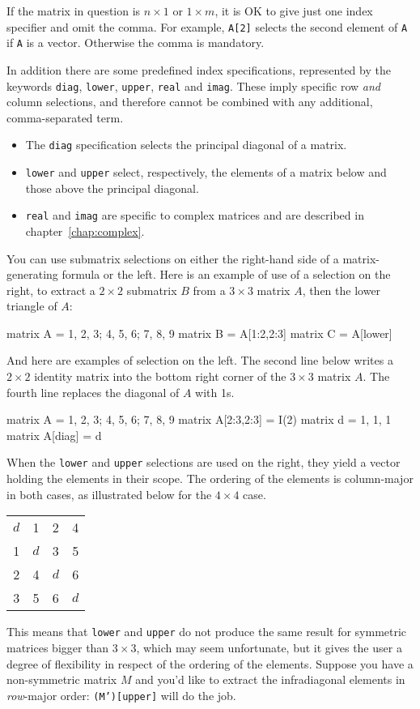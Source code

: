 If the matrix in question is $n\times 1$ or $1\times m$, it is
OK to give just one index specifier and omit the comma. For example,
\texttt{A[2]} selects the second element of \texttt{A} if \texttt{A}
is a vector. Otherwise the comma is mandatory.

In addition there are some predefined index specifications,
represented by the keywords \texttt{diag}, \texttt{lower},
\texttt{upper}, \texttt{real} and \texttt{imag}. These imply specific
row \textit{and} column selections, and therefore cannot be combined
with any additional, comma-separated term.

\begin{itemize}
\item The \texttt{diag} specification selects the principal diagonal
  of a matrix.
\item \texttt{lower} and \texttt{upper} select, respectively, the
  elements of a matrix below and those above the principal diagonal.
\item \texttt{real} and \texttt{imag} are specific to complex matrices
  and are described in chapter~\ref{chap:complex}.
\end{itemize}

You can use submatrix selections on either the right-hand side of a
matrix-generating formula or the left.  Here is an example of use of a
selection on the right, to extract a $2\times 2$ submatrix $B$ from a
$3\times 3$ matrix $A$, then the lower triangle of $A$:
%
\begin{code}
matrix A = {1, 2, 3; 4, 5, 6; 7, 8, 9}
matrix B = A[1:2,2:3]
matrix C = A[lower]
\end{code}
%
And here are examples of selection on the left.  The second line below
writes a $2\times 2$ identity matrix into the bottom right corner of the
$3\times 3$ matrix $A$.  The fourth line replaces the diagonal of $A$ 
with 1s.
%
\begin{code}
matrix A = {1, 2, 3; 4, 5, 6; 7, 8, 9}
matrix A[2:3,2:3] = I(2)
matrix d = {1, 1, 1}
matrix A[diag] = d
\end{code}

When the \texttt{lower} and \texttt{upper} selections are used on the
right, they yield a vector holding the elements in their scope. The
ordering of the elements is column-major in both cases, as illustrated
below for the $4 \times 4$ case.
\begin{center}
  \begin{tabular}{cccc}
    $d$ & 1 & 2 & 4 \\
    1 & $d$ & 3 & 5 \\
    2 & 4 & $d$ & 6 \\
    3 & 5 & 6 & $d$
  \end{tabular}
\end{center}
This means that \texttt{lower} and \texttt{upper} do not produce the
same result for symmetric matrices bigger than $3 \times 3$, which may
seem unfortunate, but it gives the user a degree of flexibility in
respect of the ordering of the elements. Suppose you have a
non-symmetric matrix $M$ and you'd like to extract the infradiagonal
elements in \textit{row}-major order: \texttt{(M')[upper]} will do the
job.

